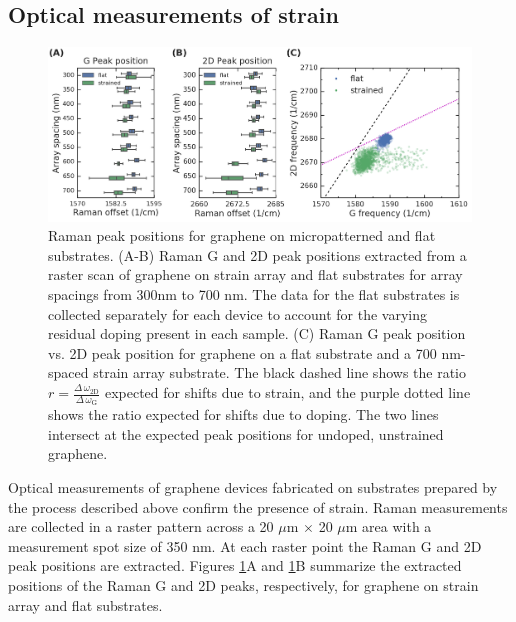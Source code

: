 \documentclass[edeposit,fullpage,draftthesis]{uiucthesis2009}
\begin{document}
    \subsection{Optical measurements of strain}
    
            \begin{figure}
            \centering
            \includegraphics[width=\columnwidth]{images/resultsanddiscussion/strainarraypaper/Figure3}
            \caption{Raman peak positions for graphene on micropatterned and flat substrates. 
                (A-B) Raman G and 2D peak positions extracted from a raster scan of graphene on
                strain array and flat substrates for array spacings from 300nm to 700 nm. The 
                data for the flat substrates is collected separately for each device to account for
                the varying residual doping present in each sample.
                (C) Raman G peak position vs. 2D peak position for graphene on a flat substrate
                and a 700 nm-spaced strain array substrate. The black dashed line shows the ratio 
                $r = \frac{\Delta \, \omega_\text{2D}}{\Delta \, \omega_\text{G}}$ expected for shifts due to
                strain, and the purple dotted line shows the ratio expected for shifts due to doping.
                The two lines intersect at the expected peak positions for undoped, unstrained graphene.
                }
            \label{'fig:raman'}
            \end{figure}
            
            Optical measurements of graphene devices fabricated on substrates prepared by the process described above
            confirm the presence of strain. Raman measurements are collected in a raster pattern across a 
            20 $\mu$m  $\times$ 20 $\mu$m area with a measurement spot size of 350 nm. 
            At each raster point the Raman G and 2D peak positions are extracted\cite{ferrari2006raman}. 
            Figures \ref{'fig:raman'}A and \ref{'fig:raman'}B summarize the extracted positions 
            of the Raman G and 2D peaks, respectively, for graphene on strain array and flat substrates.  
            
\end{document}

